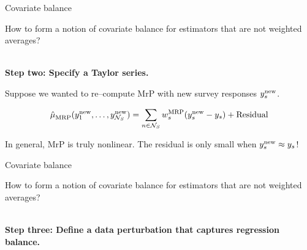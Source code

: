 \begin{frame}[t]{Covariate balance}


How to form a notion of covariate balance for estimators that are not weighted averages?


\vspace{1em}
\hrulefill\\
\textbf{Step two: Specify a Taylor series.}

\def\new{\mathrm{new}}
Suppose we wanted to re--compute MrP with new
survey responses $\y_s^{\new}$.

$$
\muhat_{\mrp}(\y_1^\new, \ldots, \y_{\nsur}^\new) =
\sumsur \w_s^\mrp (\y_s^\new  - \y_s) + \mathrm{Residual}
$$

In general, MrP is truly nonlinear. The residual is only small when $\y_s^\new \approx \y_s$!


\end{frame}



\begin{frame}[t]{Covariate balance}


How to form a notion of covariate balance for estimators that are not weighted averages?


\vspace{1em}
\hrulefill\\
\textbf{Step three: Define a data perturbation that captures regression balance.}



\end{frame}



